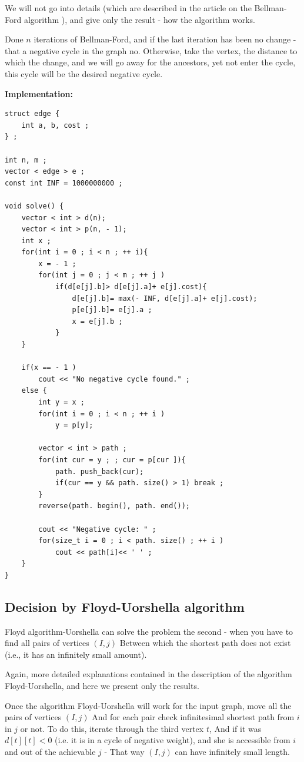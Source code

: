We will not go into details (which are described in the article on the Bellman-Ford algorithm ), and give only the result - how the algorithm works.

Done $n$ iterations of Bellman-Ford, and if the last iteration has been no change - that a negative cycle in the graph no. Otherwise, take the vertex, the distance to which the change, and we will go away for the ancestors, yet not enter the cycle, this cycle will be the desired negative cycle.

\textbf{Implementation:}

\begin{verbatim}
struct edge {
    int a, b, cost ;
} ;
 
int n, m ;
vector < edge > e ;
const int INF = 1000000000 ;
 
void solve() {
    vector < int > d(n);
    vector < int > p(n, - 1);
    int x ;
    for(int i = 0 ; i < n ; ++ i){
        x = - 1 ;
        for(int j = 0 ; j < m ; ++ j )
            if(d[e[j].b]> d[e[j].a]+ e[j].cost){
                d[e[j].b]= max(- INF, d[e[j].a]+ e[j].cost);
                p[e[j].b]= e[j].a ;
                x = e[j].b ;
            }
    }
 
    if(x == - 1 )
        cout << "No negative cycle found." ;
    else {
        int y = x ;
        for(int i = 0 ; i < n ; ++ i )
            y = p[y];
 
        vector < int > path ;
        for(int cur = y ; ; cur = p[cur ]){
            path. push_back(cur);
            if(cur == y && path. size() > 1) break ;
        }
        reverse(path. begin(), path. end());
 
        cout << "Negative cycle: " ;
        for(size_t i = 0 ; i < path. size() ; ++ i )
            cout << path[i]<< ' ' ;
    }
} 
\end{verbatim}
\subsection{ Decision by Floyd-Uorshella algorithm }

Floyd algorithm-Uorshella can solve the problem the second - when you have to find all pairs of vertices $(I, j)$ Between which the shortest path does not exist (i.e., it has an infinitely small amount).

Again, more detailed explanations contained in the description of the algorithm Floyd-Uorshella, and here we present only the results.

Once the algorithm Floyd-Uorshella will work for the input graph, move all the pairs of vertices $(I, j)$ And for each pair check infinitesimal shortest path from $i$ in $j$ or not. To do this, iterate through the third vertex $t$, And if it was $d [t][t] <0$ (i.e. it is in a cycle of negative weight), and she is accessible from $i$ and out of the achievable $j$ - That way $(I, j)$ can have infinitely small length.

